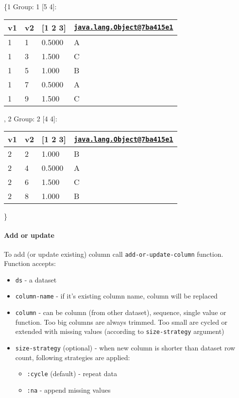 \documentclass[]{article}
\providecommand{\tightlist}{%
  \setlength{\itemsep}{0pt}\setlength{\parskip}{0pt}}
\let\oldparagraph\paragraph
\renewcommand{\paragraph}[1]{\oldparagraph{#1}\mbox{}}
\begin{document}
\{1 Group: 1 {[}5 4{]}:

\begin{longtable}[]{@{}llll@{}}
\toprule
v1 & v2 & {[}1 2 3{]} &
\href{mailto:java.lang.Object@7ba415e1}{\nolinkurl{java.lang.Object@7ba415e1}}\tabularnewline
\midrule
\endhead
1 & 1 & 0.5000 & A\tabularnewline
1 & 3 & 1.500 & C\tabularnewline
1 & 5 & 1.000 & B\tabularnewline
1 & 7 & 0.5000 & A\tabularnewline
1 & 9 & 1.500 & C\tabularnewline
\bottomrule
\end{longtable}

, 2 Group: 2 {[}4 4{]}:

\begin{longtable}[]{@{}llll@{}}
\toprule
v1 & v2 & {[}1 2 3{]} &
\href{mailto:java.lang.Object@7ba415e1}{\nolinkurl{java.lang.Object@7ba415e1}}\tabularnewline
\midrule
\endhead
2 & 2 & 1.000 & B\tabularnewline
2 & 4 & 0.5000 & A\tabularnewline
2 & 6 & 1.500 & C\tabularnewline
2 & 8 & 1.000 & B\tabularnewline
\bottomrule
\end{longtable}

\}

\paragraph{Add or update}\label{add-or-update}

To add (or update existing) column call \texttt{add-or-update-column}
function. Function accepts:

\begin{itemize}
\tightlist
\item
  \texttt{ds} - a dataset
\item
  \texttt{column-name} - if it's existing column name, column will be
  replaced
\item
  \texttt{column} - can be column (from other dataset), sequence, single
  value or function. Too big columns are always trimmed. Too small are
  cycled or extended with missing values (according to
  \texttt{size-strategy} argument)
\item
  \texttt{size-strategy} (optional) - when new column is shorter than
  dataset row count, following strategies are applied:

  \begin{itemize}
  \tightlist
  \item
    \texttt{:cycle} (default) - repeat data
  \item
    \texttt{:na} - append missing values
  \end{itemize}
\end{itemize}
\end{document}
